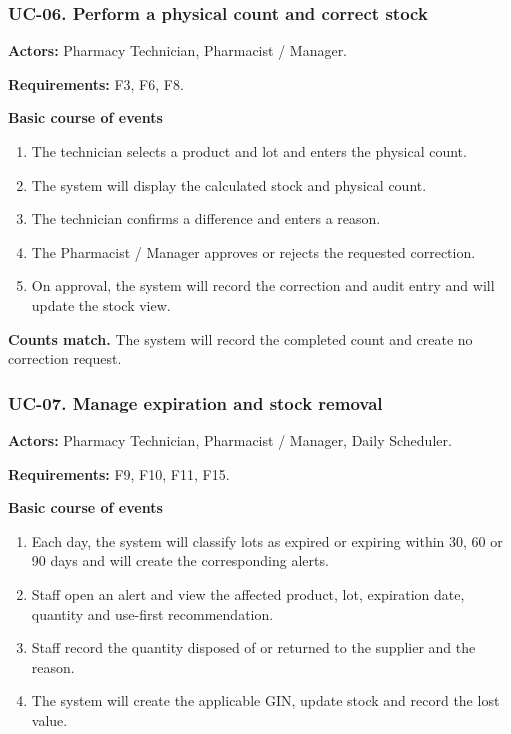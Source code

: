 \clearpage
\subsubsection*{UC-06. Perform a physical count and correct stock}
\textbf{Actors:} Pharmacy Technician, Pharmacist / Manager.

\textbf{Requirements:} F3, F6, F8.

\textbf{Basic course of events}
\begin{enumerate}
\item The technician selects a product and lot and enters the physical count.
\item The system will display the calculated stock and physical count.
\item The technician confirms a difference and enters a reason.
\item The Pharmacist / Manager approves or rejects the requested correction.
\item On approval, the system will record the correction and audit entry and will update the stock view.
\end{enumerate}

\textbf{Counts match.} The system will record the completed count and create no correction request.


\clearpage
\subsubsection*{UC-07. Manage expiration and stock removal}
\textbf{Actors:} Pharmacy Technician, Pharmacist / Manager, Daily Scheduler.

\textbf{Requirements:} F9, F10, F11, F15.

\textbf{Basic course of events}
\begin{enumerate}
\item Each day, the system will classify lots as expired or expiring within 30, 60 or 90 days and will create the corresponding alerts.
\item Staff open an alert and view the affected product, lot, expiration date, quantity and use-first recommendation.
\item Staff record the quantity disposed of or returned to the supplier and the reason.
\item The system will create the applicable GIN, update stock and record the lost value.
\end{enumerate}

